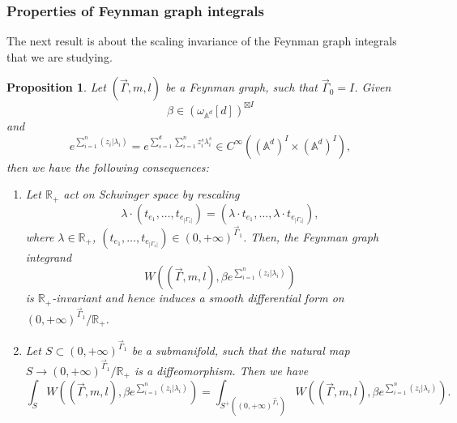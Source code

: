 \documentclass[11pt]{amsart}
\newtheorem{prop}[thm]{Proposition}
\theoremstyle{definition}
\theoremstyle{remark}
\numberwithin{equation}{section}
\begin{document}
\subsubsection{Properties of Feynman graph integrals}

The next result is about the scaling invariance of the Feynman graph integrals that we are studying.

\begin{prop}\label{useful property}
    Let $(\vec{\Gamma},m,l)$ be a Feynman graph, such that $\vec{\Gamma}_{0}= I$. Given
    $$
    \beta\in (\omega_{\mathbb{A}^{d}}[d])^{\boxtimes I}
    $$
    and
    $$
e^{\sum\limits_{i=1}^{n}(z_{i}|\lambda_{i})}=e^{\sum\limits_{s=1}^{d}\sum\limits_{i=1}^{n}z^{s}_{i}\lambda^{s}_{i}}\in C^{\infty}((\mathbb{A}^{d})^{ I}\times (\mathbb{A}^{d})^{ I}),
    $$
    then we have the following consequences:
    \begin{enumerate}
        \item
        Let $\mathbb{R}_{+}$ act on Schwinger space by rescaling
        $$
        \lambda\cdot(t_{e_{1}},\dots,t_{e_{|\Gamma_{1}|}})=(\lambda\cdot t_{e_{1}},\dots,\lambda\cdot t_{e_{|\Gamma_{1}|}}),
        $$
        where $\lambda\in \mathbb{R}_+$, $(t_{e_{1}},\dots,t_{e_{|\Gamma_{1}|}})\in (0,+\infty)^{\vec{\Gamma}_{1}}$.
        Then, the Feynman graph integrand
        $$
        W((\vec{\Gamma},m,l),\beta e^{\sum\limits_{i=1}^{n}(z_{i}|\lambda_{i})})
        $$
        is $\mathbb{R}_+$-invariant and hence induces a smooth differential form on $(0,+\infty)^{\vec{\Gamma}_{1}}/\mathbb{R}_+$.
        \item Let $S\subset(0,+\infty)^{\vec{\Gamma}_{1}}$ be a submanifold, such that the natural map $S\rightarrow(0,+\infty)^{\vec{\Gamma}_{1}}/\mathbb{R}_+$ is a diffeomorphism. Then we have
        $$
        \int_{S}W((\vec{\Gamma},m,l),\beta e^{\sum\limits_{i=1}^{n}(z_{i}|\lambda_{i})})=
        \int_{S^{+}((0,+\infty)^{\vec{\Gamma}_{1}})}W((\vec{\Gamma},m,l),\beta e^{\sum\limits_{i=1}^{n}(z_{i}|\lambda_{i})}).
        $$
    \end{enumerate}
\end{prop}
\end{document}

